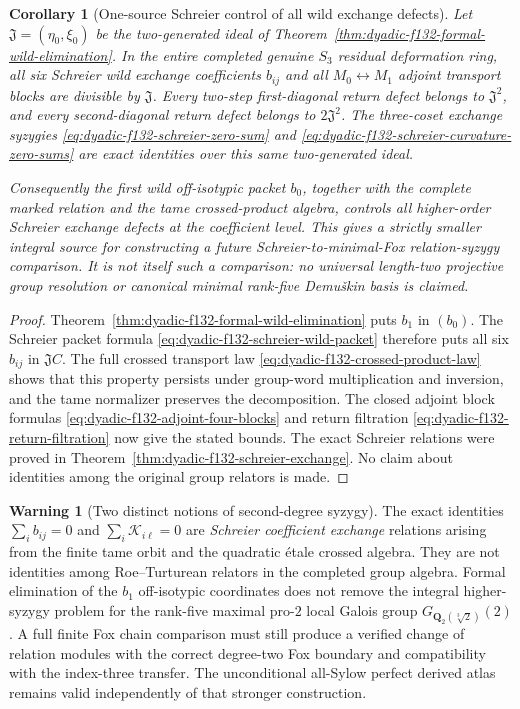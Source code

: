 \documentclass[11pt]{article}
\newtheorem{corollary}[theorem]{Corollary}
\theoremstyle{definition}
\newtheorem{warning}[theorem]{Warning}
\begin{document}
\begin{corollary}[One-source Schreier control of all wild exchange defects]
\label{cor:dyadic-f132-one-source-schreier-control}
Let
$\mathfrak J=
(\eta_0,\xi_0)$ be
the two-generated
ideal of
Theorem~\ref{thm:dyadic-f132-formal-wild-elimination}.
In the entire completed
genuine $S_3$
residual deformation
ring, all six
Schreier wild exchange
coefficients $b_{ij}$
and all
$M_0\leftrightarrow M_1$
adjoint transport
blocks are divisible
by $\mathfrak J$.
Every two-step
first-diagonal return
defect belongs to
$\mathfrak J^2$,
and every
second-diagonal
return defect
belongs to
$2\mathfrak J^2$.
The three-coset
exchange syzygies
\eqref{eq:dyadic-f132-schreier-zero-sum}
and
\eqref{eq:dyadic-f132-schreier-curvature-zero-sums}
are exact identities
over this \emph{same}
two-generated ideal.

Consequently the
first wild
off-isotypic packet
$b_0$, together
with the complete
marked relation
and the tame
crossed-product
algebra, controls
all higher-order
Schreier exchange
defects at the
coefficient level.
This gives a
strictly smaller
integral source
for constructing
a future
Schreier-to-minimal-Fox
relation-syzygy
comparison.
It is not itself
such a comparison:
no universal
length-two
projective group
resolution or
canonical minimal
rank-five
Demu\v{s}kin basis
is claimed.
\end{corollary}

\begin{proof}
Theorem~\ref{thm:dyadic-f132-formal-wild-elimination}
puts $b_1$ in
$(b_0)$.
The Schreier
packet formula
\eqref{eq:dyadic-f132-schreier-wild-packet}
therefore puts
all six $b_{ij}$
in $\mathfrak J C$.
The full crossed
transport law
\eqref{eq:dyadic-f132-crossed-product-law}
shows that this
property persists
under group-word
multiplication
and inversion,
and the tame
normalizer
preserves the
decomposition.
The closed adjoint
block formulas
\eqref{eq:dyadic-f132-adjoint-four-blocks}
and return
filtration
\eqref{eq:dyadic-f132-return-filtration}
now give the stated
bounds.
The exact
Schreier relations
were proved in
Theorem~\ref{thm:dyadic-f132-schreier-exchange}.
No claim about
identities among
the original
group relators
is made.
\end{proof}

\begin{warning}[Two distinct notions of second-degree syzygy]
\label{warn:dyadic-f132-fox-versus-exchange-syzygy}
The exact identities
$\sum_i b_{ij}=0$
and
$\sum_i\mathscr K_{i\ell}=0$
are \emph{Schreier
coefficient exchange}
relations arising
from the finite
tame orbit and
the quadratic
\'etale crossed
algebra.
They are not
identities among
Roe--Turturean
relators in the
completed group
algebra.
Formal elimination
of the $b_1$
off-isotypic
coordinates
does not remove
the integral
higher-syzygy
problem for the
rank-five maximal
pro-$2$ local
Galois group
$G_{\mathbf Q_2(\sqrt[3]2)}(2)$.
A full finite
Fox chain comparison
must still produce
a verified change
of relation modules
with the correct
degree-two
Fox boundary and
compatibility
with the
index-three
transfer.
The unconditional
all-Sylow perfect
derived atlas
remains valid
independently of
that stronger
construction.
\end{warning}
\end{document}
